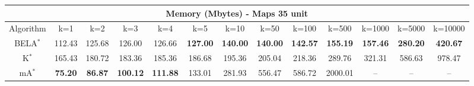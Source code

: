 \begin{tabular}{c|cccccccccccc}\toprule
\multicolumn{13}{c}{Memory (Mbytes) - Maps 35 unit}\\ \midrule
Algorithm & k=1 & k=2 & k=3 & k=4 & k=5 & k=10 & k=50 & k=100 & k=500 & k=1000 & k=5000 & k=10000 \\ \midrule
BELA$^*$ & 112.43 & 125.68 & 126.00 & 126.66 & \textbf{127.00} & \textbf{140.00} & \textbf{140.00} & \textbf{142.57} & \textbf{155.19} & \textbf{157.46} & \textbf{280.20} & \textbf{420.67} \\
K$^*$ & 165.43 & 180.72 & 183.36 & 185.36 & 186.68 & 195.36 & 205.04 & 218.36 & 289.76 & 321.31 & 586.63 & 978.47 \\
mA$^*$ & \textbf{75.20} & \textbf{86.87} & \textbf{100.12} & \textbf{111.88} & 133.01 & 281.93 & 556.47 & 586.72 & 2000.01 & -- & -- & -- \\ \bottomrule 
\end{tabular}
